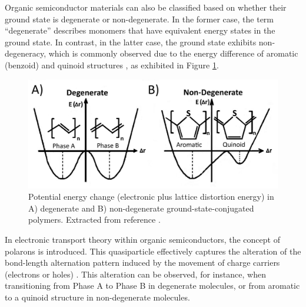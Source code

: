 

Organic semiconductor materials can also be classified based on whether their ground state is degenerate or non-degenerate. In the former case, the term ``degenerate'' describes monomers that have equivalent energy states in the ground state. In contrast, in the latter case, the ground state exhibits non-degeneracy, which is commonly observed due to the energy difference of aromatic (benzoid) and quinoid structures \cite{heegerSolitonsConductingPolymers1988a}, as exhibited in Figure \ref{fig:energy}.

\begin{figure}[h]
  \centering
  \includegraphics[width=12cm]{Images/pdf/deg_pol.pdf}
  \caption[Degenerate and non-degenerate conjugated polymers]{Potential energy change (electronic plus lattice distortion energy) in A) degenerate and B) non-degenerate ground-state-conjugated polymers. Extracted from reference \cite{heydarigharahcheshmehTextureNanostructuralEngineering2020}.}
  \label{fig:energy}
\end{figure}

In electronic transport theory within organic semiconductors, the concept of polarons is introduced. This quasiparticle effectively captures the alteration of the bond-length alternation pattern induced by the movement of charge carriers (electrons or holes) \cite{bredasRoleMobileOrganic1984}. This alteration can be observed, for instance, when transitioning from Phase A to Phase B in degenerate molecules, or from aromatic to a quinoid structure in non-degenerate molecules.

